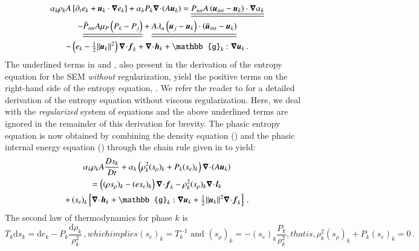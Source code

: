 \documentclass[preprint,10pt]{elsarticle}
\begin{document}
%
\begin{multline}\label{eq:int-ener-7-eqn-model-sect4}
\alpha_k \rho_k  A \left[ \partial_t  e_k + \mbold u_k \cdot \grad  e_k \right]  
+ \alpha_k P_k \div (A \mbold u_k ) =
  \underline{\underline{P_{int} A \left(\mbold u_{int}-\mbold u_k \right) \cdot \grad \alpha_k}}  \\
- \underline{\underline{\bar{P}_{int} A \mu_P \left(P_k-P_j \right)}} 
+ \underline{\underline{A \lambda_u \left(\mbold u_j-\mbold u_k  \right) \cdot \left(\bar{\mbold u}_{int}- \mbold u_k \right)}}\\
-\left( e_k -  \tfrac{1}{2} \| \mbold u_k \|^2 \right) \div \mbold f_k 
+ \div \mbold h_k + \mathbb{g}_k : \grad \mbold u_k \,.
\end{multline}
%
The underlined terms in  and , also present in the derivation of the entropy equation for the SEM \emph{without} regularization, yield the positive terms on the right-hand side of the entropy equation, . We refer the reader to  for a detailed derivation of the entropy equation  without viscous regularization. Here, we deal with the \emph{regularized} system of equations and the above underlined terms are ignored in the remainder of this derivation for brevity. 
The phasic entropy equation is now obtained by combining the density equation () and the phasic internal energy equation () through the chain rule given in  to yield:
%
\begin{multline}\label{eq:ent-res-7-eqn-diss-terms}
\alpha_k \rho_k A \frac{Ds_k}{Dt} 
+ \alpha_k \left(  \rho^2_k  (s_\rho)_k + P_k (s_e)_k  \right) \div (A \mbold u_k )  \\
=  \left( (\rho s_\rho)_k - (e s_e)_k \right) \div \mbold f_k 
- \rho^2_k (s_\rho)_k \div \mbold l_k  \\
+ \left(s_e\right)_k \left[ \div \mbold h_k + \mathbb{g}_k : \grad \mbold u_k +  \tfrac{1}{2} \| \mbold u_k \|^2 \div \mbold f_k \right]
\,.
\end{multline}
%
The second law of thermodynamics for phase $k$ is 
%
\begin{subequations}
\begin{equation}\label{eq:2nd-therm-laws-sect4}
T_k \text{d} s_k = \text{d}e_k - P_k\frac{\text{d}\rho_k}{\rho_k^2} \,,
\end{equation}
which implies 
\begin{equation}
(s_e)_k = T_k^{-1} \text{ and } (s_\rho)_k = - (s_e)_k \frac{P_k }{\rho_k^2} ,
\end{equation}
that is, 
\begin{equation} \label{eq:expr-zero}
\rho_k^2 (s_\rho)_k + P_k (s_e)_k  = 0 \,.
\end{equation}
\end{subequations}
\end{document}
